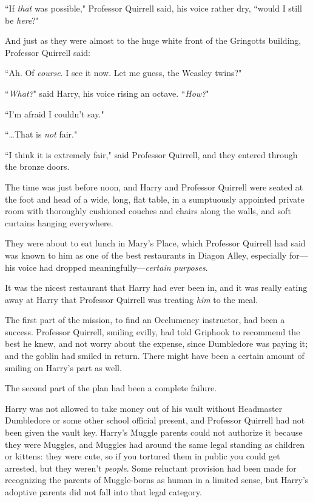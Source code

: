 ``If \emph{that} was possible," Professor Quirrell said, his voice rather dry, ``would I still be \emph{here}?"

And just as they were almost to the huge white front of the Gringotts building, Professor Quirrell said:

``Ah. Of \emph{course}. I see it now. Let me guess, the Weasley twins?"

``\emph{What?}" said Harry, his voice rising an octave.
``\emph{How?}"

``I'm afraid I couldn't say."

``{\ldots}That is \emph{not} fair."

``I think it is extremely fair," said Professor Quirrell, and they entered through the bronze doors.

\later

The time was just before noon, and Harry and Professor Quirrell were seated at the foot and head of a wide, long, flat table, in a sumptuously appointed private room with thoroughly cushioned couches and chairs along the walls, and soft curtains hanging everywhere.

They were about to eat lunch in Mary's Place, which Professor Quirrell had said was known to him as one of the best restaurants in Diagon Alley, especially for—his voice had dropped meaningfully—\emph{certain purposes}.

It was the nicest restaurant that Harry had ever been in, and it was really eating away at Harry that Professor Quirrell was treating \emph{him} to the meal.

The first part of the mission, to find an Occlumency instructor, had been a success. Professor Quirrell, smiling evilly, had told Griphook to recommend the best he knew, and not worry about the expense, since Dumbledore was paying it; and the goblin had smiled in return. There might have been a certain amount of smiling on Harry's part as well.

The second part of the plan had been a complete failure.

Harry was not allowed to take money out of his vault without Headmaster Dumbledore or some other school official present, and Professor Quirrell had not been given the vault key. Harry's Muggle parents could not authorize it because they were Muggles, and Muggles had around the same legal standing as children or kittens: they were cute, so if you tortured them in public you could get arrested, but they weren't \emph{people}. Some reluctant provision had been made for recognizing the parents of Muggle-borns as human in a limited sense, but Harry's adoptive parents did not fall into that legal category.

